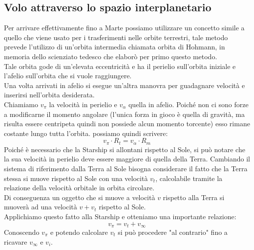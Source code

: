 \subsection{Volo attraverso lo spazio interplanetario}
Per arrivare effettivamente fino a Marte possiamo utilizzare un concetto simile a quello che viene usato per i trasferimenti nelle orbite terrestri, tale metodo prevede l'utilizzo di un'orbita intermedia chiamata orbita di Hohmann, in memoria dello scienziato tedesco che elaborò per primo questo metodo.\\
Tale orbita gode di un'elevata eccentricità e ha il perielio sull'orbita iniziale e l'afelio sull'orbita che si vuole raggiungere.\\
Una volta arrivati in afelio si esegue un'altra manovra per guadagnare velocità e inserirsi nell'orbita desiderata.\\
Chiamiamo $v_\pi$ la velocità in perielio e $v_\alpha$ quella in afelio.
Poiché non ci sono forze a modificarne il momento angolare (l'unica forza in gioco è quella di gravità, ma risulta essere centripeta quindi non possiede alcun momento torcente) esso rimane costante lungo tutta l'orbita.
possiamo quindi scrivere:
\begin{equation}
    \label{Conservazione MA}
    v_\pi \cdot R_t = v_\alpha \cdot R_m
\end{equation}
Poiché è necessario che la Starship si allontani rispetto al Sole, si può notare che la sua velocità in perielio deve essere maggiore di quella della Terra. Cambiando il sistema di riferimento dalla Terra al Sole bisogna considerare il fatto che la Terra stessa si muove rispetto al Sole con una velocità $v_t$, calcolabile tramite la relazione della velocità orbitale in orbita circolare.\\
Di conseguenza un oggetto che si muove a velocità $v$ rispetto alla Terra si muoverà ad una velocità $v + v_t$ rispetto al Sole.\\
Applichiamo questo fatto alla Starship e otteniamo una importante relazione:
$$
v_\pi = v_t + v_\infty
$$
Conoscendo $v_\pi$ e potendo calcolare $v_t$ si può procedere "al contrario" fino a ricavare $v_\infty$ e $v_i$.
